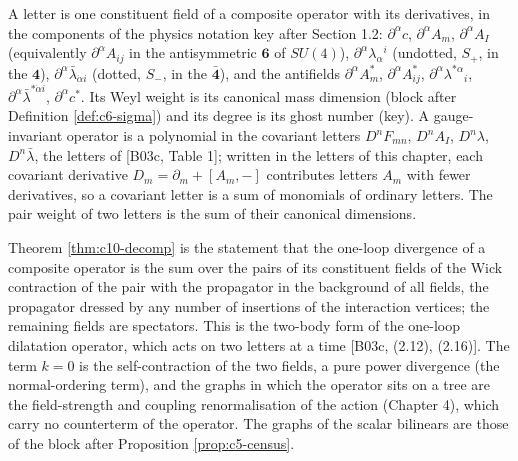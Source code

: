 \begin{remark}
A letter is one constituent field of a composite operator with its derivatives, in the components of the physics notation key after Section 1.2: $\partial^\alpha c$, $\partial^\alpha A_m$, $\partial^\alpha A_I$ (equivalently $\partial^\alpha A_{ij}$ in the antisymmetric $\mathbf 6$ of $SU(4)$), $\partial^\alpha\lambda_\alpha{}^i$ (undotted, $S_+$, in the $\mathbf 4$), $\partial^\alpha\bar\lambda_{\dot\alpha i}$ (dotted, $S_-$, in the $\bar{\mathbf 4}$), and the antifields $\partial^\alpha A^*_m$, $\partial^\alpha A^*_{ij}$, $\partial^\alpha\lambda^{*\alpha}{}_i$, $\partial^\alpha\bar\lambda^{*\dot\alpha i}$, $\partial^\alpha c^*$. Its Weyl weight is its canonical mass dimension (block after Definition \ref{def:c6-sigma}) and its degree is its ghost number (key). A gauge-invariant operator is a polynomial in the covariant letters $D^nF_{mn}$, $D^nA_I$, $D^n\lambda$, $D^n\bar\lambda$, the letters of [B03c, Table 1]; written in the letters of this chapter, each covariant derivative $D_m=\partial_m+[A_m,-]$ contributes letters $A_m$ with fewer derivatives, so a covariant letter is a sum of monomials of ordinary letters. The pair weight of two letters is the sum of their canonical dimensions.
\end{remark}

\begin{remark}
Theorem \ref{thm:c10-decomp} is the statement that the one-loop divergence of a composite operator is the sum over the pairs of its constituent fields of the Wick contraction of the pair with the propagator in the background of all fields, the propagator dressed by any number of insertions of the interaction vertices; the remaining fields are spectators. This is the two-body form of the one-loop dilatation operator, which acts on two letters at a time [B03c, (2.12), (2.16)]. The term $k=0$ is the self-contraction of the two fields, a pure power divergence (the normal-ordering term), and the graphs in which the operator sits on a tree are the field-strength and coupling renormalisation of the action (Chapter 4), which carry no counterterm of the operator. The graphs of the scalar bilinears are those of the block after Proposition \ref{prop:c5-census}.
\end{remark}


